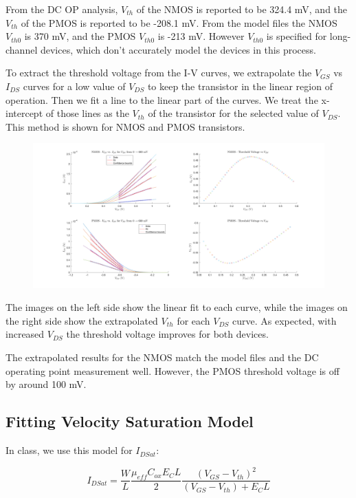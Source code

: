 \documentclass[11pt]{article}
\begin{document}
From the DC OP analysis, $V_{th}$ of the NMOS is reported to be 324.4 mV, and the $V_{th}$ of the PMOS is reported to be -208.1 mV. From the model files the NMOS $V_{th0}$ is 370 mV, and the PMOS $V_{th0}$ is -213 mV. However $V_{th0}$ is specified for long-channel devices, which don't accurately model the devices in this process.

To extract the threshold voltage from the I-V curves, we extrapolate the $V_{GS}$ vs $I_{DS}$ curves for a low value of $V_{DS}$ to keep the transistor in the linear region of operation. Then we fit a line to the linear part of the curves. We treat the x-intercept of those lines as the $V_{th}$ of the transistor for the selected value of $V_{DS}$. This method is shown for NMOS and PMOS transistors.

\begin{figure}[H]
	\centerline{\includegraphics[width=\textwidth+5cm]{images/threshold_voltage.png}}	
\end{figure}

The images on the left side show the linear fit to each curve, while the images on the right side show the extrapolated $V_{th}$ for each $V_{DS}$ curve. As expected, with increased $V_{DS}$ the threshold voltage improves for both devices. 

The extrapolated results for the NMOS match the model files and the DC operating point measurement well. However, the PMOS threshold voltage is off by around 100 mV.

\subsection{Fitting Velocity Saturation Model}
In class, we use this model for $I_{DSat}$:

\begin{equation*}
	I_{DSat} = \frac{W}{L} \frac{\mu_{eff} C_{ox} E_C L}{2} \frac{(V_{GS} - V_{th})^2}{(V_{GS} - V_{th}) + E_C L}
\end{equation*}
\end{document}
